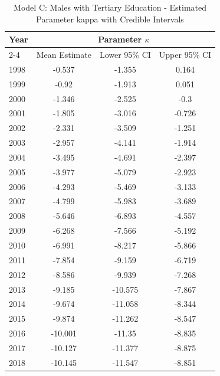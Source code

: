\begin{landscape}
\begin{table}[htbp]
\centering
\caption{Model C: Males with Tertiary Education - Estimated Parameter kappa  with Credible Intervals}
\label{tab:parameters_k24}
\begin{tabular}{@{}lccc@{}}
\toprule
Year & \multicolumn{3}{c}{Parameter \(\kappa\)} \\
\cmidrule(lr){2-4}
      & Mean Estimate & Lower 95\% CI & Upper 95\% CI \\
\midrule
1998 & -0.537 & -1.355 & 0.164 \\
1999 & -0.92 & -1.913 & 0.051 \\
2000 & -1.346 & -2.525 & -0.3 \\
2001 & -1.805 & -3.016 & -0.726 \\
2002 & -2.331 & -3.509 & -1.251 \\
2003 & -2.957 & -4.141 & -1.914 \\
2004 & -3.495 & -4.691 & -2.397 \\
2005 & -3.977 & -5.079 & -2.923 \\
2006 & -4.293 & -5.469 & -3.133 \\
2007 & -4.799 & -5.983 & -3.689 \\
2008 & -5.646 & -6.893 & -4.557 \\
2009 & -6.268 & -7.566 & -5.192 \\
2010 & -6.991 & -8.217 & -5.866 \\
2011 & -7.854 & -9.159 & -6.719 \\
2012 & -8.586 & -9.939 & -7.268 \\
2013 & -9.185 & -10.575 & -7.867 \\
2014 & -9.674 & -11.058 & -8.344 \\
2015 & -9.874 & -11.262 & -8.547 \\
2016 & -10.001 & -11.35 & -8.835 \\
2017 & -10.127 & -11.377 & -8.875 \\
2018 & -10.145 & -11.547 & -8.851 \\
\bottomrule
\end{tabular}
\end{table}
\end{landscape}